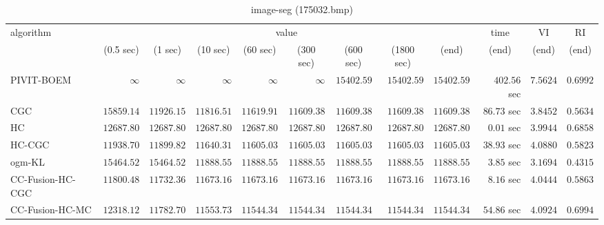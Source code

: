 \begin{table}[H]
\scriptsize
\centering
\caption{image-seg (175032.bmp)}
\label{tab:anytimetable-image-seg-175032.bmp}
\begin{tabular}{lrrrrrrrrrrr}
\toprule
           algorithm &                                   \multicolumn{8}{c}{value} & \multicolumn{1}{c}{time}    & \multicolumn{1}{c}{VI}  & \multicolumn{1}{c}{RI} \\  
\cmidrule(lr){2-9}\cmidrule(lr){10-10} \cmidrule(lr){11-11} \cmidrule(lr){12-12}   
                     & \multicolumn{1}{c}{(0.5 sec)} & \multicolumn{1}{c}{(1 sec)} & \multicolumn{1}{c}{(10 sec)} & \multicolumn{1}{c}{(60 sec)} & \multicolumn{1}{c}{(300 sec)} & \multicolumn{1}{c}{(600 sec)} & \multicolumn{1}{c}{(1800 sec)} & \multicolumn{1}{c}{(end)} & \multicolumn{1}{c}{(end)}    & \multicolumn{1}{c}{(end)}   & \multicolumn{1}{c}{(end)}  \\ \midrule 
          PIVIT-BOEM & $\infty$ & $\infty$ & $\infty$ & $\infty$ & $\infty$ & $     15402.59$ & $     15402.59$ & $     15402.59$ & $       402.56$ sec    & $       7.5624$  & $       0.6992$ \\ 
                 CGC & $     15859.14$ & $     11926.15$ & $     11816.51$ & $     11619.91$ & $     11609.38$ & $     11609.38$ & $     11609.38$ & $     11609.38$ & $        86.73$ sec    & $       3.8452$  & $       0.5634$ \\ 
                  HC & $     12687.80$ & $     12687.80$ & $     12687.80$ & $     12687.80$ & $     12687.80$ & $     12687.80$ & $     12687.80$ & $     12687.80$ & $         0.01$ sec    & $       3.9944$  & $       0.6858$ \\ 
              HC-CGC & $     11938.70$ & $     11899.82$ & $     11640.31$ & $     11605.03$ & $     11605.03$ & $     11605.03$ & $     11605.03$ & $     11605.03$ & $        38.93$ sec    & $       4.0880$  & $       0.5823$ \\ 
              ogm-KL & $     15464.52$ & $     15464.52$ & $     11888.55$ & $     11888.55$ & $     11888.55$ & $     11888.55$ & $     11888.55$ & $     11888.55$ & $         3.85$ sec    & $       3.1694$  & $       0.4315$ \\ 
    CC-Fusion-HC-CGC & $     11800.48$ & $     11732.36$ & $     11673.16$ & $     11673.16$ & $     11673.16$ & $     11673.16$ & $     11673.16$ & $     11673.16$ & $         8.16$ sec    & $       4.0444$  & $       0.5863$ \\ 
     CC-Fusion-HC-MC & $     12318.12$ & $     11782.70$ & $     11553.73$ & $     11544.34$ & $     11544.34$ & $     11544.34$ & $     11544.34$ & $     11544.34$ & $        54.86$ sec    & $       4.0924$  & $       0.6994$ \\ 

\end{tabular}
\end{table}
